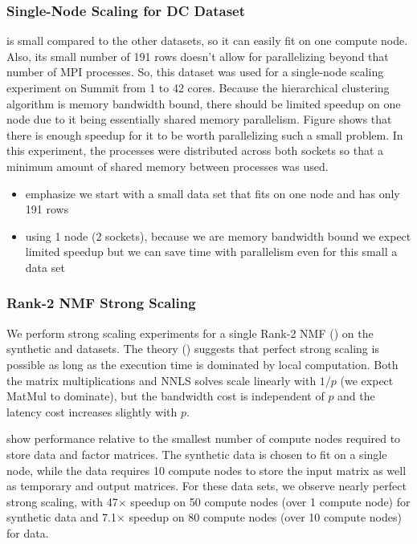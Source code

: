 \subsubsection{Single-Node Scaling for DC Dataset}


\hyper{} is small compared to the other datasets, so it can easily fit on one compute node.
Also, its small number of 191 rows doesn't allow for parallelizing beyond that number of MPI processes.
So, this dataset was used for a single-node scaling experiment on Summit from 1 to 42 cores.
Because the hierarchical clustering algorithm is memory bandwidth bound, there should be limited speedup on one node due to it being essentially shared memory 
parallelism. Figure  shows that there is enough speedup for it to be worth parallelizing such a small problem. In this experiment, the
processes were distributed across both sockets so that a minimum amount of shared memory between processes was used.


\begin{itemize}
	\item emphasize we start with a small data set that fits on one node and has only 191 rows
	\item using 1 node (2 sockets), because we are memory bandwidth bound we expect limited speedup but we can save time with parallelism even for this small a data set
\end{itemize}

\subsubsection{Rank-2 NMF Strong Scaling}

We perform strong scaling experiments for a single Rank-2 NMF () on the synthetic and \image{} datasets.
The theory () suggests that perfect strong scaling is possible as long as the execution time is dominated by local computation.
Both the matrix multiplications and NNLS solves scale linearly with $1/p$ (we expect MatMul to dominate), but the bandwidth cost is independent of $p$ and the latency cost increases slightly with $p$.

 show performance relative to the smallest number of compute nodes required to store data and factor matrices.
The synthetic data is chosen to fit on a single node, while the \image{} data requires 10 compute nodes to store the input matrix as well as temporary and output matrices.
For these data sets, we observe nearly perfect strong scaling, with 47$\times$ speedup on 50 compute nodes (over 1 compute node) for synthetic data and 7.1$\times$ speedup on 80 compute nodes (over 10 compute nodes) for \image{} data.

